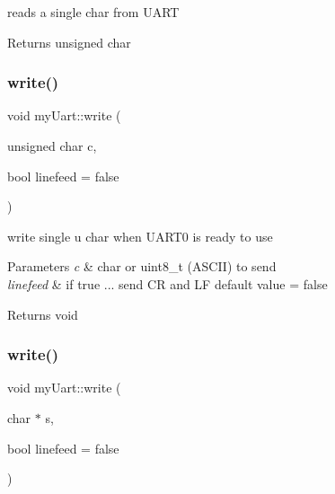 reads a single char from U\+A\+RT 

\begin{DoxyReturn}{Returns}
unsigned char 
\end{DoxyReturn}
\mbox{\label{classmy_uart_adf132d7000ec0061040552a91097e065}} 
\subsubsection{\texorpdfstring{write()}{write()}\hspace{0.1cm}{\footnotesize\ttfamily [1/8]}}
{\footnotesize\ttfamily void my\+Uart\+::write (\begin{DoxyParamCaption}\item[{unsigned char}]{c,  }\item[{bool}]{linefeed = {\ttfamily false} }\end{DoxyParamCaption})}



write single u char when U\+A\+R\+T0 is ready to use 


\begin{DoxyParams}{Parameters}
{\em c} & char or uint8\+\_\+t (A\+S\+C\+II) to send \\
\hline
{\em linefeed} & if true ... send CR and LF default value = false \\
\hline
\end{DoxyParams}
\begin{DoxyReturn}{Returns}
void 
\end{DoxyReturn}
\mbox{\label{classmy_uart_a1427c57d57b93ea2e34679e9080051a9}} 
\subsubsection{\texorpdfstring{write()}{write()}\hspace{0.1cm}{\footnotesize\ttfamily [2/8]}}
{\footnotesize\ttfamily void my\+Uart\+::write (\begin{DoxyParamCaption}\item[{char $\ast$}]{s,  }\item[{bool}]{linefeed = {\ttfamily false} }\end{DoxyParamCaption})}




